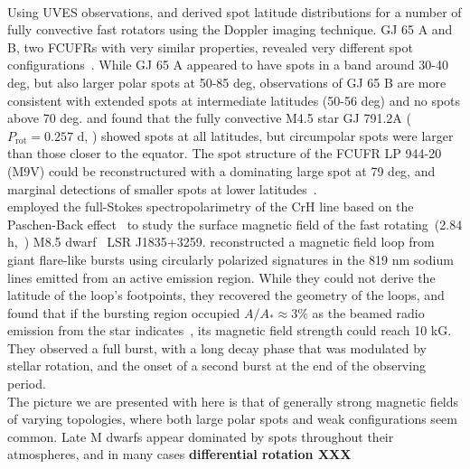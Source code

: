 \documentclass[fleqn,usenatbib,letters]{mnras}%
\begin{document}
\\
Using UVES observations, \citet{barnes2015} and \citet{barnes2017} derived spot latitude distributions for a number of fully convective fast rotators using the Doppler imaging technique. GJ 65 A and B, two FCUFRs with very similar properties, revealed very different spot configurations~\citep{barnes2017}. While GJ 65 A appeared to have spots in a band around 30-40 deg, but also larger polar spots at 50-85 deg, observations of GJ 65 B are more consistent with extended spots at intermediate latitudes (50-56 deg) and no spots above 70 deg. \citet{barnes2015} and \citet{barnes2017} found that the fully convective M4.5 star GJ 791.2A ($P_\mathrm{rot} = 0.257$ d, \citealt{newton2016}) showed spots at all latitudes, but circumpolar spots were larger than those closer to the equator. The spot structure of the FCUFR LP 944-20 (M9V) could be reconstructured with a dominating large spot at 79 deg, and marginal detections of smaller spots at lower latitudes~\citep{barnes2015}. 
\\
\citep{kuzmychov2017} employed the full-Stokes spectropolarimetry of the CrH line based on the Paschen-Back effect~\citep{kuzmychov2013} to study the surface magnetic field of the fast rotating~(2.84 h,~\citealt{hallinan2008}) M8.5 dwarf~\citep{deshpande2012} LSR J1835+3259. \citet{berdyugina2017} reconstructed a magnetic field loop from giant flare-like bursts using circularly polarized signatures in the 819 nm sodium lines emitted from an active emission region. While they could not derive the latitude of the loop's footpoints, they recovered the geometry of the loops, and found that if the bursting region occupied $A/A_*\approx 3\%$ as the beamed radio emission from the star indicates~\citep{hallinan2015}, its magnetic field strength could reach 10 kG. They observed a full burst, with a long decay phase that was modulated by stellar rotation, and the onset of a second burst at the end of the observing period.
\\
The picture we are presented with here is that of generally strong magnetic fields of varying topologies, where both large polar spots and weak configurations seem common. Late M dwarfs appear dominated by spots throughout their atmospheres, and in many cases \textbf{differential rotation XXX}
\end{document}
